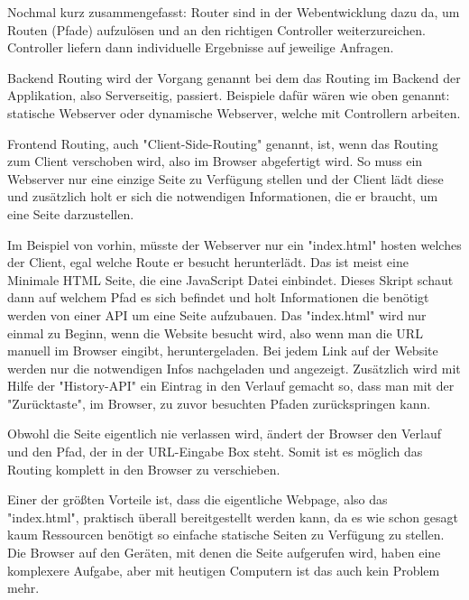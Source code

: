 Nochmal kurz zusammengefasst: Router sind in der Webentwicklung dazu da, um Routen (Pfade) aufzulösen und an den richtigen Controller weiterzureichen. Controller liefern dann individuelle Ergebnisse auf jeweilige Anfragen.


Backend Routing wird der Vorgang genannt bei dem das Routing im Backend der Applikation, also Serverseitig, passiert. Beispiele dafür wären wie oben genannt: statische Webserver oder dynamische Webserver, welche mit Controllern arbeiten.


Frontend Routing, auch "Client-Side-Routing" genannt, ist, wenn das Routing zum Client verschoben wird, also im Browser abgefertigt wird. So muss ein Webserver nur eine einzige Seite zu Verfügung stellen und der Client lädt diese und zusätzlich holt er sich die notwendigen Informationen, die er braucht, um eine Seite darzustellen.

Im Beispiel von vorhin, müsste der Webserver nur ein "{\ttfamily index.html}" hosten welches der Client, egal welche Route er besucht herunterlädt. Das ist meist eine Minimale HTML Seite, die eine JavaScript Datei einbindet. Dieses Skript schaut dann auf welchem Pfad es sich befindet und holt Informationen die benötigt werden von einer API um eine Seite aufzubauen. Das "{\ttfamily index.html}" wird nur einmal zu Beginn, wenn die Website besucht wird, also wenn man die URL manuell im Browser eingibt, heruntergeladen. Bei jedem Link auf der Website werden nur die notwendigen Infos nachgeladen und angezeigt. Zusätzlich wird mit Hilfe der "History-API" ein Eintrag in den Verlauf gemacht so, dass man mit der "Zurücktaste", im Browser, zu zuvor besuchten Pfaden zurückspringen kann.

Obwohl die Seite eigentlich nie verlassen wird, ändert der Browser den Verlauf und den Pfad, der in der URL-Eingabe Box steht. Somit ist es möglich das Routing komplett in den Browser zu verschieben.


Einer der größten Vorteile ist, dass die eigentliche Webpage, also das "{\ttfamily index.html}", praktisch überall bereitgestellt werden kann, da es wie schon gesagt kaum Ressourcen benötigt so einfache statische Seiten zu Verfügung zu stellen. Die Browser auf den Geräten, mit denen die Seite aufgerufen wird, haben eine komplexere Aufgabe, aber mit heutigen Computern ist das auch kein Problem mehr.

